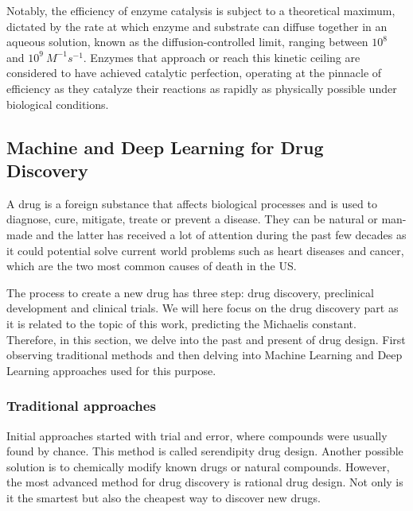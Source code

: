 Notably, the efficiency of enzyme catalysis is subject to a theoretical maximum, dictated by 
the rate at which enzyme and substrate can diffuse together in an aqueous solution, known as 
the diffusion-controlled limit, ranging between $10^8$ and $10^9\ M^{-1}s^{-1}$. Enzymes that 
approach or reach this kinetic ceiling are considered to have achieved catalytic perfection, 
operating at the pinnacle of efficiency as they catalyze their reactions as rapidly as physically 
possible under biological conditions.

\subsection{Machine and Deep Learning for Drug Discovery}

A drug is a foreign substance that affects biological processes and is used to diagnose, cure, mitigate, treate or prevent a disease. \cite{FDA2022Glossary} They can be natural or man-made and the latter has received a lot of attention during the past few decades as it could potential solve current world problems such as heart diseases and cancer, which are the two most common causes of death in the US. \cite{UnderlyingCauseDeath2020}

The process to create a new drug has three step: drug discovery, preclinical development and clinical trials. We will here focus on the drug discovery part as it is related to the topic of this work, predicting the Michaelis constant. Therefore, in this section, we delve into the past and present of drug design. First observing traditional methods and then delving into Machine Learning and Deep Learning approaches used for this purpose.

\subsubsection{Traditional approaches}

Initial approaches started with trial and error, where compounds were usually found by chance. This method is called serendipity drug design. \cite{Ban2006Serendipity} Another possible solution is to chemically modify known drugs or natural compounds. \cite{Cheng2013Cyclosporin} However, the most advanced method for drug discovery is rational drug design. \cite{MANDAL200990} Not only is it the smartest but also the cheapest way to discover new drugs. 

